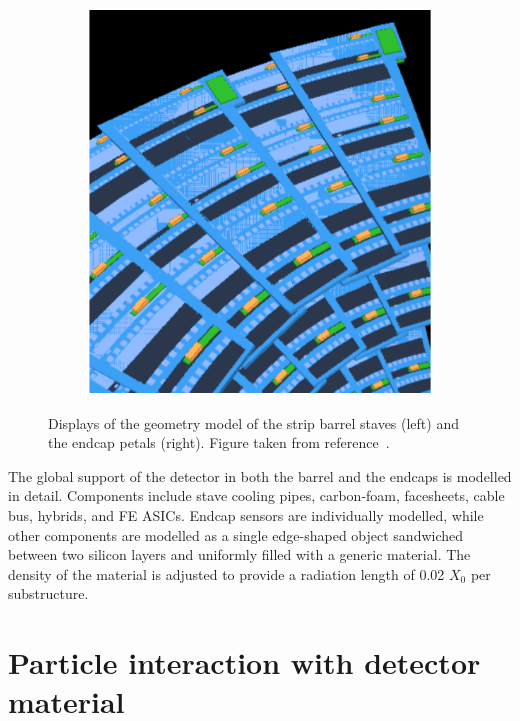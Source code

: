\begin{figure}[h!]
\begin{subfigure}[b]{0.49\textwidth}
        \includegraphics[width=\textwidth]{figures/itk-endcap-petals.png}
        \caption{}
        \label{subfig:itk-endcap-petal}
    \end{subfigure}
    \caption{Displays of the \GEANT geometry model of the strip barrel staves (left) and the endcap petals (right). Figure taken from reference~\cite{ATLAS-TDR-30}.}
    \label{fig:itk-strip}
\end{figure}

The global support of the detector in both the barrel and the endcaps is modelled in detail. Components include stave cooling pipes, carbon-foam, facesheets, cable bus, hybrids, and FE ASICs. Endcap sensors are individually modelled, while other components are modelled as a single edge-shaped object sandwiched between two silicon layers and uniformly filled with a generic material. The density of the material is adjusted to provide a radiation length of 0.02 $X_0$ per substructure. 

\section{Particle interaction with detector material}
\label{sect:material-effects}

